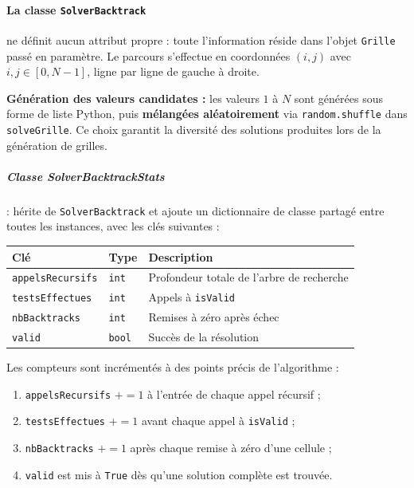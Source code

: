 \documentclass[a4paper]{article}
\begin{document}
\paragraph{ La classe \texttt{SolverBacktrack}}



ne définit aucun attribut propre : toute l'information réside dans
l'objet \texttt{Grille} passé en paramètre. Le parcours s'effectue en coordonnées $(i, j)$
avec $i, j \in [0, N-1]$, ligne par ligne de gauche à droite.



\medskip
\noindent\textbf{Génération des valeurs candidates :} les valeurs $1$ à $N$ sont générées
sous forme de liste Python, puis \textbf{mélangées aléatoirement} via \texttt{random.shuffle}
dans \texttt{solveGrille}. Ce choix garantit la diversité des solutions produites lors de la
génération de grilles.

\subparagraph{Classe SolverBacktrackStats}:
 hérite de \texttt{SolverBacktrack} et ajoute un dictionnaire
de classe partagé entre toutes les instances, avec les clés suivantes :

\begin{center}
\begin{tabular}{lll}
  \toprule
  \textbf{Clé} & \textbf{Type} & \textbf{Description} \\
  \midrule
  \texttt{appelsRecursifs} & \texttt{int} & Profondeur totale de l'arbre de recherche \\
  \texttt{testsEffectues}  & \texttt{int} & Appels à \texttt{isValid} \\
  \texttt{nbBacktracks}    & \texttt{int} & Remises à zéro après échec \\
  \texttt{valid}           & \texttt{bool} & Succès de la résolution \\
  \bottomrule
\end{tabular}
\end{center}

Les compteurs sont incrémentés à des points précis de l'algorithme :

\begin{enumerate}[noitemsep]
  \item \texttt{appelsRecursifs} $\mathrel{+}= 1$ à l'entrée de chaque appel récursif ;
  \item \texttt{testsEffectues} $\mathrel{+}= 1$ avant chaque appel à \texttt{isValid} ;
  \item \texttt{nbBacktracks} $\mathrel{+}= 1$ après chaque remise à zéro d'une cellule ;
  \item \texttt{valid} est mis à \texttt{True} dès qu'une solution complète est trouvée.
\end{enumerate}
\end{document}
